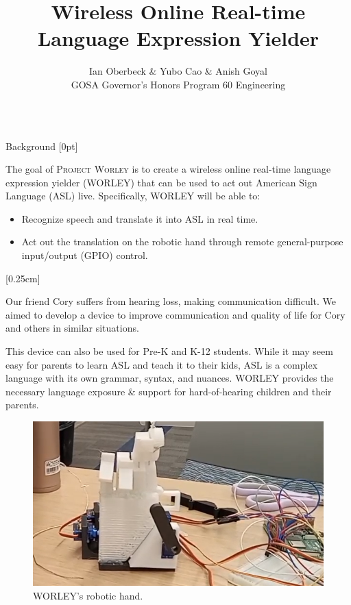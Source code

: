 \documentclass[final, 20pt]{beamer}
\title{Wireless Online Real-time Language Expression Yielder}
\author{Ian Oberbeck \& Yubo Cao \& Anish Goyal \\\normalfont GOSA Governor's Honors Program 60 Engineering}
\newlength{\colwidth}
\begin{document}
\begin{frame}[t]
\centering
\begin{columns}[t]
\margincolumn

\begin{column}{\colwidth}

  \begin{block}{Background}
    [0pt]

    The goal of \textsc{Project Worley} is to create a wireless online real-time language expression yielder (WORLEY) that can be used to act out American Sign Language (ASL) live. Specifically, WORLEY will be able to:

    \begin{itemize}
      \item Recognize speech and translate it into ASL in real time.
      \item Act out the translation on the robotic hand through remote general-purpose input/output (GPIO) control.
    \end{itemize}

    [0.25cm]

    Our friend Cory suffers from hearing loss, making communication difficult. We aimed to develop a device to improve communication and quality of life for Cory and others in similar situations.

    This device can also be used for Pre-K and K-12 students.  While it may seem easy for parents to learn ASL and teach it to their kids, ASL is a complex language with its own grammar, syntax, and nuances. WORLEY provides the necessary language exposure \& support for hard-of-hearing children and their parents.
  \end{block}

  \begin{figure}
    \centering
    \includegraphics[width=0.75\linewidth]{images/hand.png}
    \caption{WORLEY's robotic hand.}
    \label{fig:hand}
  \end{figure}


\end{column}
\end{columns}
\end{frame}
\end{document}
